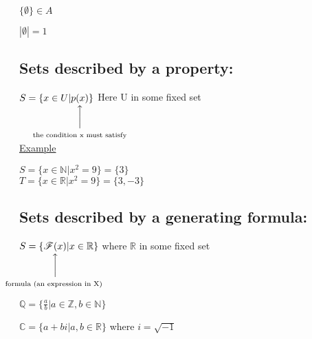 \documentclass{article}
\makeatletter
\newcommand\vertarrowbox[3][6ex]{%
  \begin{array}[t]{@{}c@{}} #2 \\
  \left\uparrow\vcenter{\hrule height #1}\right.\kern-\nulldelimiterspace\\
  \makebox[0pt]{\scriptsize#3}
  \end{array}%
}
\makeatother
\begin{document}
\indent\indent$\{\emptyset\} \in A$

\indent\indent$|\emptyset| = 1$



\subsection{Sets described by a property:}

$S = \{ x \in U \vert\vertarrowbox{p(x)}{the condition x must satisfy}\}$
Here U in some fixed set\\
\underline{Example}

\noindent$S = \{ x \in \mathbb{N} \vert x^{2} = 9\} = \{3\}$
\\
$T = \{ x \in \mathbb{R} \vert x^{2} = 9\} = \{3,-3\}$

\subsection{Sets described by a generating formula:}
$S = \{\vertarrowbox{\mathscr{F}(x)}{ 
     formula
     (an expression in X)
    
    } \vert x \in \mathbb{R}\}$   where $\mathbb{R}$ in some fixed set

\noindent$\mathbb{Q}=\{\frac{a}{b} \vert a \in \mathbb{Z},  b \in \mathbb{N}\}$

\noindent$\mathbb{C} = \{a+bi\vert a,b\in \mathbb{R}\}$ where $i = \sqrt{-1}$
\end{document}
